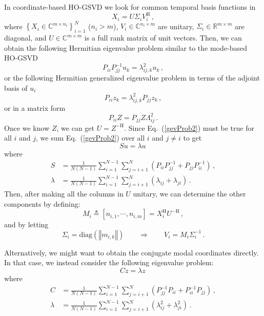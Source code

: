 \documentclass[10pt]{article}
\newcommand{\norm}[1]{\left\Vert#1\right\Vert}
\newcommand{\eq}[1]{Eq.\ (\ref{#1})}
\begin{document}
In coordinate-based HO-GSVD we look for common temporal basis functions in
\begin{equation}
    X_i = U \Sigma_i V_i^\mathrm{H}\,,
\end{equation}
where $\left\{X_i\in\mathbb{C}^{m\times n_i}\right\}_{i=1}^N$ ($n_i>m$), $V_i\in\mathbb{C}^{n_i\times m}$ are unitary, $\Sigma_i\in\mathbb{R}^{m\times m}$ are diagonal, and $U\in\mathbb{C}^{m\times m}$ is a full rank matrix of unit vectors.
Then, we can obtain the following Hermitian eigenvalue problem similar to the mode-based HO-GSVD
\begin{equation}\label{gevProb2}
    P_{ii}P_{jj}^{-1} u_k = \lambda^2_{ij,k} u_k \,,    
\end{equation}
or the following Hermitian generalized eigenvalue problem in terms of the adjoint basis of $u_i$
\begin{equation}
    P_{ii} z_k = \lambda^2_{ij,k} P_{jj} z_k \,,
\end{equation}
or in a matrix form
\begin{equation}
        P_{ii} Z = P_{jj} Z \Lambda^2_{ij} \,.
\end{equation}
Once we know $Z$, we can get $U = Z^{-\mathrm{H}}$.
Since \eq{gevProb2} must be true for all $i$ and $j$, we sum \eq{gevProb2} over all $i$ and $j\ne i$ to get
\begin{equation}
     S u = \lambda u \,
\end{equation}
where
\begin{equation}
\begin{aligned}
    S & = \frac{1}{N(N-1)}\sum_{i=1}^{N-1} \sum_{j=i+1}^N \left(P_{ii}P_{jj}^{-1}+P_{jj}P_{ii}^{-1}\right)\,,\\
    \lambda & = \frac{1}{N(N-1)}\sum_{i=1}^{N-1} \sum_{j=i+1}^N \left(\lambda_{ij}+\lambda_{ji}\right)\,.
\end{aligned}    
\end{equation}
Then, after making all the columns in $U$ unitary, we can determine the other components by defining:
\begin{equation}
    M_i\triangleq\left[n_{i,1}, \cdots, n_{i,m} \right] = X_i^\mathrm{H} U^\mathrm{-H}\,,
\end{equation}
and by letting
\begin{equation}
    \Sigma_{i} = \mathrm{diag} \left(\norm{m_{i,k}}\right) \qquad \Rightarrow \qquad V_i =  M_i \Sigma_{i}^{-1}\,.
\end{equation}

Alternatively, we might want to obtain the conjugate modal coordinates directly.
In that case, we instead consider the following eigenvalue problem:
\begin{equation}
     C z = \lambda z\,
\end{equation}
where
\begin{equation}
\begin{aligned}
    C & = \frac{1}{N(N-1)}\sum_{i=1}^{N-1} \sum_{j=i+1}^N \left(P_{jj}^{-1}P_{ii}+P_{ii}^{-1}P_{jj}\right)\,,\\
    \lambda & = \frac{1}{N(N-1)}\sum_{i=1}^{N-1} \sum_{j=i+1}^N \left(\lambda^2_{ij}+\lambda^2_{ji}\right)\,.
\end{aligned}    
\end{equation}
\end{document}
